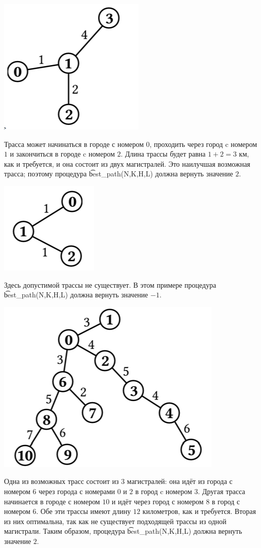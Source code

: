 \includegraphics{race1.png}

Трасса может начинаться в городе с номером $0$, проходить через город c номером $1$ и закончиться в городе c номером $2$. Длина трассы будет равна $1 + 2 = 3$ км, как и требуется, и она состоит из двух магистралей. Это наилучшая возможная трасса; поэтому процедура \t{best\_path(N,K,H,L)} должна вернуть значение $2$.

\includegraphics{race2.png}

Здесь допустимой трассы не существует. В этом примере процедура \t{best\_path(N,K,H,L)} должна вернуть значение $-1$.

\includegraphics{race3.png}

Одна из возможных трасс состоит из $3$ магистралей: она идёт из города с номером $6$ через города с номерами $0$ и $2$ в город c номером $3$. Другая трасса начинается в городе с номером $10$ и идёт через город с номером $8$ в город с номером $6$. Обе эти трассы имеют длину $12$ километров, как и требуется. Вторая из них оптимальна, так как не существует подходящей трассы из одной магистрали. Таким образом, процедура \t{best\_path(N,K,H,L)} должна вернуть значение $2$.
